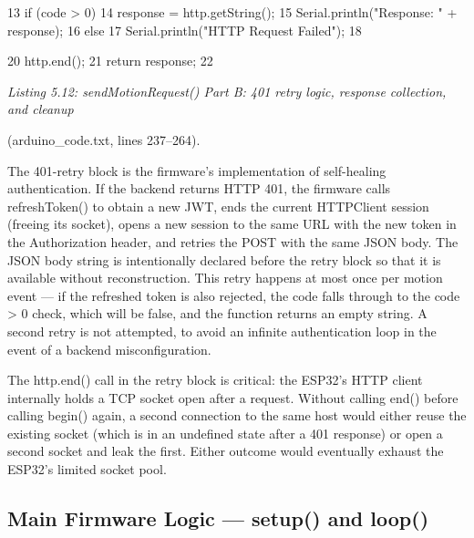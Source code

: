{13 if (code > 0) {
14 response = http.getString();
15 Serial.println("Response: " + response);
16 } else {
17 Serial.println("HTTP Request Failed");
18 }

20 http.end();
21 return response;
22 }







\textit{Listing 5.12: sendMotionRequest() Part B: 401 retry logic, response collection, and cleanup}

(arduino\_code.txt, lines 237--264).


The 401-retry block is the ﬁrmware's implementation of self-healing authentication. If
the backend returns HTTP 401, the ﬁrmware calls refreshToken() to obtain a new JWT,
ends the current HTTPClient session (freeing its socket), opens a new session to the same
URL with the new token in the Authorization header, and retries the POST with the same
JSON body. The JSON body string is intentionally declared before the retry block so that
it is available without reconstruction. This retry happens at most once per motion event ---
if the refreshed token is also rejected, the code falls through to the code > 0 check, which
will be false, and the function returns an empty string. A second retry is not attempted, to
avoid an inﬁnite authentication loop in the event of a backend misconﬁguration.

The http.end() call in the retry block is critical: the ESP32's HTTP client internally
holds a TCP socket open after a request. Without calling end() before calling begin()
again, a second connection to the same host would either reuse the existing socket (which
is in an undeﬁned state after a 401 response) or open a second socket and leak the ﬁrst.
Either outcome would eventually exhaust the ESP32's limited socket pool.


\subsection{Main Firmware Logic --- setup() and loop()}


